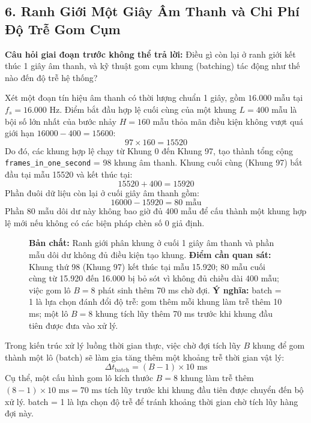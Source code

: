 \documentclass[11pt,a4paper]{article}
\begin{document}
\clearpage


\subsection*{6. Ranh Giới Một Giây Âm Thanh và Chi Phí Độ Trễ Gom Cụm}

\textbf{Câu hỏi giai đoạn trước không thể trả lời:} Điều gì còn lại ở ranh giới kết thúc 1 giây âm thanh, và kỹ thuật gom cụm khung (batching) tác động như thế nào đến độ trễ hệ thống?

Xét một đoạn tín hiệu âm thanh có thời lượng chuẩn 1 giây, gồm $16.000$ mẫu tại $f_s = 16.000\text{ Hz}$. Điểm bắt đầu hợp lệ cuối cùng của một khung $L = 400$ mẫu là bội số lớn nhất của bước nhảy $H = 160$ mẫu thỏa mãn điều kiện không vượt quá giới hạn $16000 - 400 = 15600$:
\[
97 \times 160 = 15520
\]
Do đó, các khung hợp lệ chạy từ Khung 0 đến Khung 97, tạo thành tổng cộng \texttt{frames\_in\_one\_second} = 98 khung âm thanh. Khung cuối cùng (Khung 97) bắt đầu tại mẫu 15520 và kết thúc tại:
\[
15520 + 400 = 15920
\]
Phần đuôi dữ liệu còn lại ở cuối giây âm thanh gồm:
\[
16000 - 15920 = 80\text{ mẫu}
\]
Phần 80 mẫu dôi dư này không bao giờ đủ 400 mẫu để cấu thành một khung hợp lệ mới nếu không có các biện pháp chèn số 0 giả định.

\begin{figure}[h]
\centering

\caption{\textbf{Bản chất:} Ranh giới phân khung ở cuối 1 giây âm thanh và phần mẫu dôi dư không đủ điều kiện tạo khung. \textbf{Điểm cần quan sát:} Khung thứ 98 (Khung 97) kết thúc tại mẫu 15.920; 80 mẫu cuối cùng từ 15.920 đến 16.000 bị bỏ sót vì không đủ chiều dài 400 mẫu; việc gom lô $B=8$ phát sinh thêm 70 ms chờ đợi. \textbf{Ý nghĩa:} batch = 1 là lựa chọn đánh đổi độ trễ: gom thêm mỗi khung làm trễ thêm 10 ms; một lô $B = 8$ khung tích lũy thêm 70 ms trước khi khung đầu tiên được đưa vào xử lý.}
\label{fig:1_4_tail}
\end{figure}

Trong kiến trúc xử lý luồng thời gian thực, việc chờ đợi tích lũy $B$ khung để gom thành một lô (batch) sẽ làm gia tăng thêm một khoảng trễ thời gian vật lý:
\[
\Delta t_{\text{batch}} = (B - 1) \times 10\text{ ms}
\]
Cụ thể, một cấu hình gom lô kích thước $B = 8$ khung làm trễ thêm $(8 - 1) \times 10\text{ ms} = 70\text{ ms}$ tích lũy trước khi khung đầu tiên được chuyển đến bộ xử lý. batch = 1 là lựa chọn độ trễ để tránh khoảng thời gian chờ tích lũy hàng đợi này.
\end{document}

